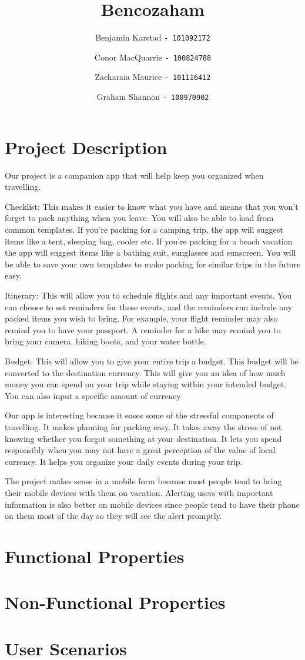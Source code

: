 \documentclass[12pt]{article}
\title{Bencozaham}
\author{
	Benjamin Karstad
	\texttt{- 101092172}
	\and
	Conor MacQuarrie
	\texttt{- 100824788}
	\and
	Zacharaia Maurice
	\texttt{- 101116412}
	\and
	Graham Shannon
	\texttt{- 100970902}
}
\begin{document}
\maketitle

\section*{Project Description}
Our project is a companion app that will help keep you organized when travelling. 

Checklist: This makes it easier to know what you have and means that you won't forget to pack anything when you leave. You will also be able to load from common templates. If you're packing for a camping trip, the app will suggest items like a tent, sleeping bag, cooler etc. If you're packing for a beach vacation the app will suggest items like a bathing suit, sunglasses and sunscreen. You will be able to save your own templates to make packing for similar trips in the future easy.

Itinerary: This will allow you to schedule flights and any important events. You can choose to set reminders for these events, and the reminders can include any packed items you wish to bring. For example, your flight reminder may also remind you to have your passport. A reminder for a hike may remind you to bring your camera, hiking boots, and your water bottle. 

Budget: This will allow you to give your entire trip a budget. This budget will be converted to the destination currency. This will give you an idea of how much money you can spend on your trip while staying within your intended budget. You can also input a specific amount of currency

Our app is interesting because it eases some of the stressful components of travelling. It makes planning for packing easy. It takes away the stress of not knowing whether you forgot something at your destination. It lets you spend responsibly when you may not have a great perception of the value of local currency. It helps you organize your daily events during your trip.

The project makes sense in a mobile form because most people tend to bring their mobile devices with them on vacation. Alerting users with important information is also better on mobile devices since people tend to have their phone on them most of the day so they will see the alert promptly.

\section*{Functional Properties}
\section*{Non-Functional Properties}
\section*{User Scenarios}
\end{document}
